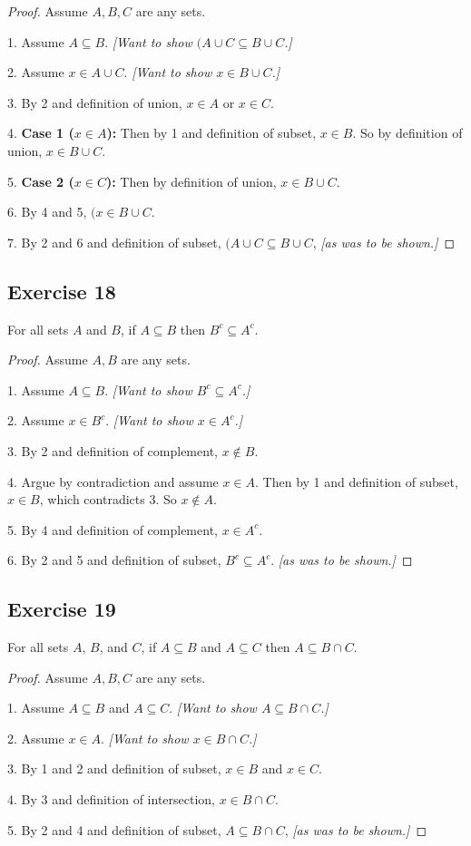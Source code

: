 \documentclass[14pt]{extarticle}
\begin{document}
\begin{proof}
  Assume $A,B,C$ are any sets.

  1. Assume \(A \subseteq B\). {\it [Want to show \((A \cup C \subseteq B \cup C\).]}

  2. Assume \(x \in A \cup C\). {\it [Want to show \(x \in B \cup C\).]}

  3. By 2 and definition of union, $x \in A$ or $x \in C$.

  4. {\bf Case 1 ($x \in A$):} Then by 1 and definition of subset, $x \in B$. So by definition of union, \(x \in B \cup C\).

  5. {\bf Case 2 ($x \in C$):} Then by definition of union, \(x \in B \cup C\).

  6. By 4 and 5, \((x \in B \cup C\).

  7. By 2 and 6 and definition of subset, \((A \cup C \subseteq B \cup C\), {\it [as was to be shown.]}
\end{proof}

\subsection{Exercise 18}
For all sets $A$ and $B$, if \(A \subseteq B\) then \(B^c \subseteq A^c\).

\begin{proof}
  Assume $A,B$ are any sets.

  1. Assume \(A \subseteq B\). {\it [Want to show \(B^c \subseteq A^c\).]}

  2. Assume \(x \in B^c\). {\it [Want to show \(x \in A^c \).]}

  3. By 2 and definition of complement, $x \notin B$.

  4. Argue by contradiction and assume $x \in A$. Then by 1 and definition of subset, $x \in B$, which contradicts 3.
  So $x \notin A$.

  5. By 4 and definition of complement, $x \in A^c$.

  6. By 2 and 5 and definition of subset, \(B^c \subseteq A^c\). {\it [as was to be shown.]}
\end{proof}

\subsection{Exercise 19}
For all sets $A$, $B$, and $C$, if \(A \subseteq B\) and \(A \subseteq C\) then \(A \subseteq B \cap C\).

\begin{proof}
  Assume $A,B,C$ are any sets.

  1. Assume \(A \subseteq B\) and \(A \subseteq C\). {\it [Want to show \(A \subseteq B \cap C\).]}

  2. Assume \(x \in A\). {\it [Want to show \(x \in B \cap C\).]}

  3. By 1 and 2 and definition of subset, $x \in B$ and $x \in C$.

  4. By 3 and definition of intersection, \(x \in B \cap C\).

  5. By 2 and 4 and definition of subset, \(A \subseteq B \cap C\), {\it [as was to be shown.]}
\end{proof}
\end{document}
